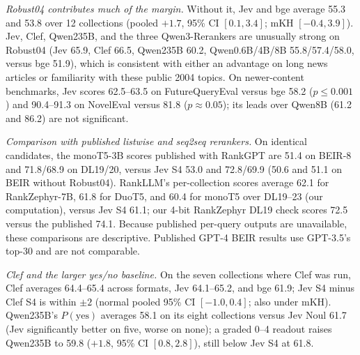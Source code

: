 \emph{Robust04 contributes much of the margin.} Without it, Jev and bge average 55.3 and 53.8 over 12 collections (pooled $+1.7$, 95\% CI $[0.1,3.4]$; mKH $[-0.4,3.9]$). Jev, Clef, Qwen235B, and the three Qwen3-Rerankers are unusually strong on Robust04 (Jev 65.9, Clef 66.5, Qwen235B 60.2, Qwen0.6B/4B/8B 55.8/57.4/58.0, versus bge 51.9), which is consistent with either an advantage on long news articles or familiarity with these public 2004 topics. On newer-content benchmarks, Jev scores 62.5--63.5 on FutureQueryEval versus bge 58.2 ($p\le0.001$) and 90.4--91.3 on NovelEval versus 81.8 ($p\approx0.05$); its leads over Qwen8B (61.2 and 86.2) are not significant.

\emph{Comparison with published listwise and seq2seq rerankers.} On identical candidates, the monoT5-3B scores published with RankGPT\cite{sun2023rankgpt} are 51.4 on BEIR-8 and 71.8/68.9 on DL19/20, versus Jev S4 53.0 and 72.8/69.9 (50.6 and 51.1 on BEIR without Robust04). RankLLM's per-collection scores\cite{rankllm} average 62.1 for RankZephyr-7B, 61.8 for DuoT5, and 60.4 for monoT5 over DL19--23 (our computation), versus Jev S4 61.1; our 4-bit RankZephyr DL19 check scores 72.5 versus the published 74.1. Because published per-query outputs are unavailable, these comparisons are descriptive. Published GPT-4 BEIR results use GPT-3.5's top-30 and are not comparable.

\emph{Clef and the larger yes/no baseline.} On the seven collections where Clef was run, Clef averages 64.4--65.4 across formats, Jev 64.1--65.2, and bge 61.9; Jev S4 minus Clef S4 is within $\pm2$ (normal pooled 95\% CI $[-1.0,0.4]$; also under mKH). Qwen235B's $P(\text{yes})$ averages 58.1 on its eight collections versus Jev Noul 61.7 (Jev significantly better on five, worse on none); a graded 0--4 readout raises Qwen235B to 59.8 ($+1.8$, 95\% CI $[0.8,2.8]$), still below Jev S4 at 61.8.

